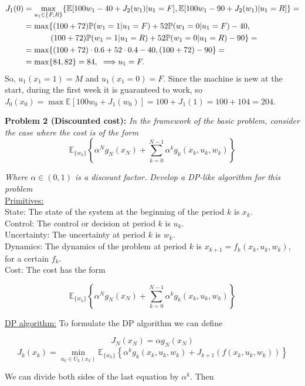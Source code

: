 \documentclass[11pt, english]{article}
\begin{document}
\begin{align}
J_1(0)&=\underset{u_1\in\{F,R\}}{\max}\{\mathbb{E}[100w_1-40+J_2(w_1)|u_1=F],\mathbb{E}[100w_1-90+J_2(w_1)|u_1=R]\}=\\
&=\max\{(100+72)\mathbb{P}(w_1=1|u_1=F)+52\mathbb{P}(w_1=0|u_1=F)-40,\\
&\hspace{12mm}(100+72)\mathbb{P}(w_1=1|u_1=R)+52\mathbb{P}(w_1=0|u_1=R)-90\}=\\
&=\max\{(100+72)\cdot 0.6+52\cdot 0.4-40,(100+72)-90\}=\\
&=\max\{84,82\}=84,\text{ }\Longrightarrow u_1=F.
\end{align}
So, $u_1(x_1=1)=M$ and $u_1(x_1=0)=F$. Since the machine is new at the start, during the first week it is guaranteed to work, so $J_0(x_0)=\max\mathbb{E}[100w_0+J_1(w_0)]=100+J_1(1)=100+104=204$.

\textbf{Problem 2 (Discounted cost):}\textit{ In the framework of the basic problem, consider the case where the cost is of the form}
$$\mathbb{E}_{\{w_k\}}\left\{\alpha^N g_N(x_N) +  \sum_{k = 0}^{N - 1} \alpha^k g_k\left(x_k,u_k,w_k\right) \right\}$$

\textit{Where $\alpha \in (0,1)$ is a discount factor. Develop a DP-like algorithm for this problem}\\

\underline{Primitives:}\\
State: The state of the system at the beginning of the period $k$ is $x_k$.\\
Control: The control or decision at period $k$ is $u_k$.\\
Uncertainty: The uncertainty at period $k$ is $w_k$.\\
Dynamics: The dynamics of the problem at period $k$ is $x_{k+1}=f_k(x_k,u_k,w_k)$, for a certain $f_k$.\\
Cost: The cost has the form

$$\mathbb{E}_{\{w_k\}}\left\{\alpha^N g_N(x_N) +  \sum_{k = 0}^{N - 1} \alpha^k g_k\left(x_k,u_k,w_k\right) \right\}$$

\underline{DP algorithm:} To formulate the DP algorithm we can define

$$J_N (x_N) = \alpha g_N (x_N)$$
$$J_k(x_k) = \min_{u_k \in U_k(x_k)}\mathbb{E}_{\{w_k\}}\left\{\alpha^k g_k\left(x_k,u_k,w_k\right) + J_{k + 1} \left(f\left(x_k,u_k,w_k\right)\right) \right\}$$

We can divide both sides of the last equation by $\alpha^k$. Then
\end{document}
